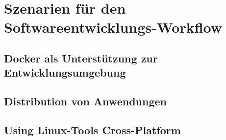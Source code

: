 
\chapter{Szenarien für den Softwareentwicklungs-Workflow}
\label{cha:szenarien}
\section{Docker als Unterstützung zur Entwicklungsumgebung}
\label{sec:docker-assistance}
\section{Distribution von Anwendungen}
\section{Using Linux-Tools Cross-Platform}

